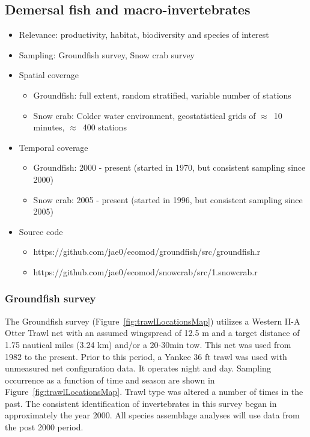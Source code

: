 \documentclass[letterpaper,portrait,11pt]{scrartcl}
\numberwithin{equation}{section}		%
\numberwithin{figure}{section}		%
\numberwithin{table}{section}				%
\begin{document}
\subsection{Demersal fish and macro-invertebrates}
\begin{itemize}
  \item Relevance:  productivity, habitat, biodiversity and species of interest
  \item Sampling:  Groundfish survey, Snow crab survey 
  \item Spatial coverage
    \begin{itemize}
      \item Groundfish: full extent, random stratified, variable number of stations
      \item Snow crab: Colder water environment, geostatistical grids of $\approx$~10 minutes, $\approx$~400 stations 
    \end{itemize}
  \item Temporal coverage
    \begin{itemize}
      \item Groundfish: 2000 - present (started in 1970, but consistent sampling since 2000)
      \item Snow crab: 2005 - present (started in 1996, but consistent sampling since 2005)
    \end{itemize}

  \item Source code
      \begin{itemize}
        \item https://github.com/jae0/ecomod/groundfish/src/groundfish.r
        \item https://github.com/jae0/ecomod/snowcrab/src/1.snowcrab.r
      \end{itemize}
  
\end{itemize}


\subsubsection{Groundfish survey}
\label{sec:groundfishSurvey}
The Groundfish survey (Figure~\ref{fig:trawlLocationsMap}) utilizes a Western II-A Otter Trawl net with an assumed wingspread of 12.5 m and a target distance of 1.75 nautical miles (3.24 km) and/or a 20-30min tow. This net was used from 1982 to the present. Prior to this period, a Yankee 36 ft trawl was used with unmeasured net configuration data. It operates night and day. Sampling occurrence as a function of time and season are shown in Figure~\ref{fig:trawlLocationsMap}. Trawl type was altered a number of times in the past. The consistent identification of invertebrates in this survey began in approximately the year 2000. All species assemblage analyses will use data from the post 2000 period.
\end{document}
